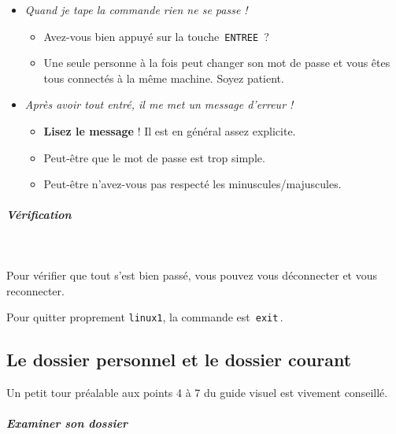\documentclass[a4paper,11pt]{article}
\begin{document}
\begin{itemize}
				
\item \textit{Quand je tape la commande rien ne se passe !}

\begin{itemize}				
\item Avez-vous bien appuy\'e sur la touche \,\verb|ENTREE|\, ?
\item Une seule personne \`a la fois peut changer son mot de passe et vous \^etes tous connect\'es \`a la m\^eme machine. Soyez patient.
\end{itemize}
				
\item \textit{Apr\`es avoir tout entr\'e, il me met un message d'erreur !}
\begin{itemize}
\item \textbf{Lisez le message} ! Il est en g\'en\'eral assez explicite.
\item Peut-\^etre que le mot de passe est trop simple.
\item Peut-\^etre n'avez-vous pas respect\'e les minuscules/majuscules.
\end{itemize}
\end{itemize}
				
			
\subparagraph{V\'erification} 
		
\textcolor{white}{.} \par
				
\par
        
Pour v\'erifier que tout s'est bien pass\'e, vous pouvez vous d\'econnecter et vous reconnecter.
        
 \par
        
Pour quitter proprement \verb_linux1_, la commande est \,\verb|exit|\,.
				
\par

\subsection{Le dossier personnel et le dossier courant}
Un petit tour pr\'ealable aux points 4 \`a 7 du guide visuel est vivement conseill\'e.
				
 \par
        
			
\subparagraph{Examiner son dossier} 
		
\end{document}
